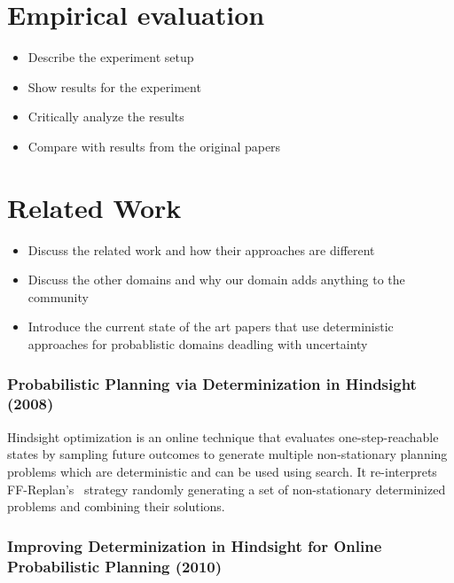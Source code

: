 \documentclass[runningheads,a4paper]{llncs}
\begin{document}
\section{Empirical evaluation}

\begin{itemize}
	\item Describe the experiment setup
	\item Show results for the experiment
	\item Critically analyze the results
	\item Compare with results from the original papers
\end{itemize}


\section{Related Work}

\begin{itemize}
	\item Discuss the related work and how their approaches are different
	\item Discuss the other domains and why our domain adds anything to the community
	\item Introduce the current state of the art papers that use deterministic approaches for probablistic domains deadling with uncertainty
\end{itemize}

\subsubsection{Probabilistic Planning via Determinization in Hindsight (2008)~\cite{yoon2008probabilistic}}

Hindsight optimization is an online technique that evaluates one-step-reachable
states by sampling future outcomes to generate multiple non-stationary planning
problems which are deterministic and can be used using search. It re-interprets
FF-Replan's~\cite{FFReplan} strategy randomly generating a set of non-stationary
determinized problems and combining their solutions.

\subsubsection{Improving Determinization in Hindsight for Online Probabilistic Planning (2010)~\cite{yoon2010improving}}
\end{document}
